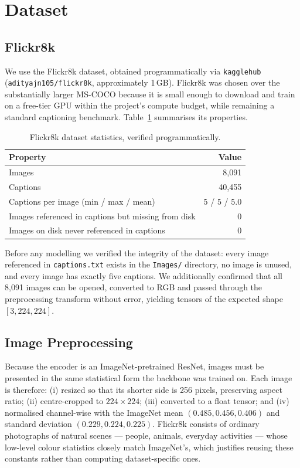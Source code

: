 \documentclass{article}
\begin{document}
\section{Dataset}

\subsection{Flickr8k}

We use the Flickr8k dataset, obtained programmatically via
\texttt{kagglehub} (\texttt{adityajn105/flickr8k}, approximately 1\,GB).
Flickr8k was chosen over the substantially larger MS-COCO
\citep{lin2014microsoft} because it is small enough to download and train on a
free-tier GPU within the project's compute budget, while remaining a standard
captioning benchmark. Table~\ref{tab:dataset} summarises its properties.

\begin{table}[h]
  \caption{Flickr8k dataset statistics, verified programmatically.}
  \label{tab:dataset}
  \centering
  \begin{tabular}{lr}
    \toprule
    Property & Value \\
    \midrule
    Images & 8{,}091 \\
    Captions & 40{,}455 \\
    Captions per image (min / max / mean) & 5 / 5 / 5.0 \\
    Images referenced in captions but missing from disk & 0 \\
    Images on disk never referenced in captions & 0 \\
    \bottomrule
  \end{tabular}
\end{table}

Before any modelling we verified the integrity of the dataset: every image
referenced in \texttt{captions.txt} exists in the \texttt{Images/} directory, no
image is unused, and every image has exactly five captions. We additionally
confirmed that all 8{,}091 images can be opened, converted to RGB and passed
through the preprocessing transform without error, yielding tensors of the
expected shape $[3, 224, 224]$.

\subsection{Image Preprocessing}

Because the encoder is an ImageNet-pretrained ResNet, images must be presented in
the same statistical form the backbone was trained on. Each image is therefore:
(i) resized so that its shorter side is 256 pixels, preserving aspect ratio;
(ii) centre-cropped to $224 \times 224$; (iii) converted to a float tensor; and
(iv) normalised channel-wise with the ImageNet mean $(0.485, 0.456, 0.406)$ and
standard deviation $(0.229, 0.224, 0.225)$. Flickr8k consists of ordinary
photographs of natural scenes --- people, animals, everyday activities --- whose
low-level colour statistics closely match ImageNet's, which justifies reusing
these constants rather than computing dataset-specific ones.
\end{document}
